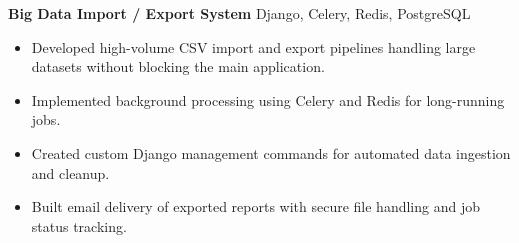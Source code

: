 \documentclass[11pt]{article}
\begin{document}
\textbf{Big Data Import / Export System} \hfill Django, Celery, Redis, PostgreSQL\\
\begin{itemize}
	\item Developed high-volume CSV import and export pipelines handling large datasets without blocking the main application.
	\item Implemented background processing using Celery and Redis for long-running jobs.
	\item Created custom Django management commands for automated data ingestion and cleanup.
	\item Built email delivery of exported reports with secure file handling and job status tracking.
\end{itemize}

\vfill
\end{document}
